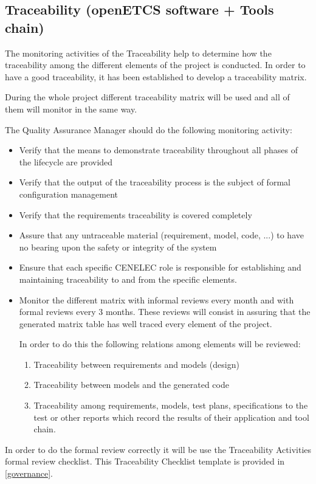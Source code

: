 \documentclass{template/openetcs_article}
\begin{document}
\subsection{Traceability (openETCS software + Tools chain)}

The monitoring activities of the Traceability help to determine how the traceability among the different elements of the project is conducted. In order to have a good traceability, it has been established to develop a traceability matrix. 

During the whole project different traceability matrix will be used and all of them will monitor in the same way.

The Quality Assurance Manager should do the following monitoring activity:
\begin{itemize}
\item Verify that the means to demonstrate traceability throughout all phases of the lifecycle are provided
\item Verify that the output of the traceability process is the subject of formal configuration management
\item Verify that the requirements traceability is covered completely
\item Assure that any untraceable material (requirement, model, code, ...) to have no bearing upon the safety or integrity of the system
\item Ensure that each specific CENELEC role is responsible for establishing and maintaining traceability to and from the specific elements.
\item Monitor the different matrix with informal reviews every month and with formal reviews every 3 months. These reviews will consist in assuring that the generated matrix table has well traced every element of the project.

In order to do this the following relations among elements will be reviewed:
\begin{enumerate}
\item Traceability between requirements and models (design)
\item Traceability between models and the generated code
\item Traceability among requirements, models, test plans, specifications to the test or other reports which record the results of their application and tool chain.
\end{enumerate}
\end{itemize}

In order to do the formal review correctly it will be use the Traceability Activities formal review checklist. This Traceability Checklist template is provided in \href{https://github.com/openETCS/governance/tree/master/Templates}{[governance]}.
\end{document}
